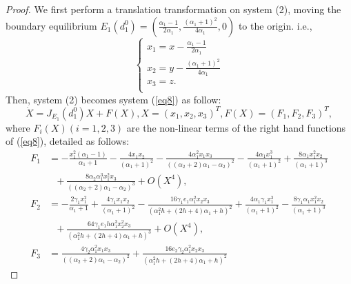 \documentclass{ws-ijbc}
\begin{document}
\begin{proof}
We first perform a translation transformation on system (2), moving the boundary equilibrium
$E_{1}(d_{1}^{0})=(\frac{\alpha_{1}-1}{2\alpha_{1}},\frac{(\alpha_{1}+1)^{2}}{4\alpha_{1}},0)$ to the origin. i.e.,
\begin{equation}
\left\{
\begin{array}{l}
x_{1}=x-\frac{\alpha_{1}-1}{2\alpha_{1}}\\
x_{2}=y-\frac{(\alpha_{1}+1)^{2}}{4\alpha_{1}}\\
x_{3}=z.\\
\end{array}
\right.
\end{equation}
Then, system (2) becomes system (\ref{eq8}) as follow:
\begin{equation}\label{eq8}
    \dot{X}=J_{E_{1}}(d_{1}^{0})X+F(X),X=(x_{1},x_{2},x_{3})^{T},F(X)=(F_{1},F_{2},F_{3})^{T},
\end{equation}
where $F_{i}(X)(i=1,2,3)$ are the non-linear terms of the right hand functions of (\ref{eq8}), detailed as follows:
\begin{equation*}
\begin{aligned}
F_{1}&=-\frac{x_{1}^{2} \left(\alpha_{1}-1\right)}{\alpha_{1}+1}-\frac{4 x_{1} x_{2}}{\left(\alpha_{1}+1\right)^{2}}-\frac{4\alpha_{1}^{2} x_{1} x_{3} }{\left(\left(\alpha_{2}+2\right) \alpha_{1}-\alpha_{2}\right)^{2}}
-\frac{4\alpha_{1} x_{1}^{3} }{\left(\alpha_{1}+1\right)^{2}}
+\frac{8\alpha_{1} x_{1}^{2} x_{2}}
{\left(\alpha_{1}+1\right)^{3}}
\\&~~~
+\frac{8 \alpha_{2} \alpha_{1}^{3}x_{1}^{2} x_{3} }{\left(\left(\alpha_{2}+2\right) \alpha_{1}-\alpha_{2}\right)^{3}}+O\left(X^{4}\right),\\
F_{2}&=-\frac{2 \gamma_{1} x_{1}^{2}}{\alpha_{1}+1}+\frac{4 \gamma_{1} x_{1} x_{2}}{\left(\alpha_{1}+1\right)^{2}}-\frac{16 \gamma_{1}  e_{1} \alpha_{1}^{2}x_{2} x_{3}}{\left(\alpha_{1}^{2} h +\left(2 h +4\right) \alpha_{1}+h \right)^{2}}
+\frac{4 \alpha_{1} \gamma_{1} x_{1}^{3}}{\left(\alpha_{1}+1\right)^{2}}-\frac{8 \gamma_{1} \alpha_{1} x_{1}^{2} x_{2}}{\left(\alpha_{1}+1\right)^{3}}
\\&
~~~+\frac{64 \gamma_{1}e_{1} h \alpha_{1}^{3} x_{2}^{2} x_{3}}{\left(\alpha_{1}^{2} h +\left(2 h +4\right) \alpha_{1}+h \right)^{3}}+O\left(X^{4}\right),\\
F_{3}&=\frac{4 \gamma_{2} \alpha_{1}^{2} x_{1} x_{3}}{\left(\left(\alpha_{2}+2\right) \alpha_{1}-\alpha_{2}\right)^{2}}+\frac{16 e_{2} \gamma_{2} \alpha_{1}^{2}x_{2} x_{3} }{\left(\alpha_{1}^{2} h +\left(2 h +4\right) \alpha_{1}+h \right)^{2}}

\end{aligned}
\end{equation*}
\end{proof}
\end{document}
